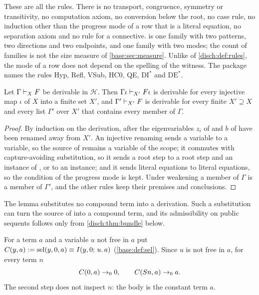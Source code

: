 These are all the rules. There is no transport, congruence, symmetry or
transitivity, no computation axiom, no conversion below the root, no case
rule, no induction other than the progress mode of a row that is a literal
equation, no separation axiom and no rule for a connective. 
is one family with two patterns, two directions and two endpoints, and
 one family with two modes; the count of families is not the
size measure of \cref{base:sec:measure}. Unlike  of
\cref{disch:def:rules}, the mode of a row does not depend on the spelling of
the witness. The package names the rules Hyp, Refl, VSub, HC0, QE,
$\mathrm{DI}^*$ and $\mathrm{DE}^*$.

\begin{lemma}
\label{disch:lem:bundle-struct}
Let $\Gamma\vdash_XF$ be derivable in $\mathcal H$. Then
$\Gamma\iota\vdash_{X'}F\iota$ is derivable for every injective map
$\iota$ of $X$ into a finite set $X'$, and $\Gamma'\vdash_{X'}F$ is
derivable for every finite $X'\supseteq X$ and every list $\Gamma'$ over
$X'$ that contains every member of $\Gamma$.
\end{lemma}

\begin{proof}
By induction on the derivation, after the eigenvariables $z_i$ of
 and $b$ of  have been renamed away from $X'$.
An injective renaming sends a variable to a variable, so the source of
 remains a variable of the scope; it commutes with
capture-avoiding substitution, so it sends a root step to a root step and
an instance of ,  or  to an instance;
and it sends literal equations to literal equations, so the condition of
the progress mode is kept. Under weakening a member of $\Gamma$ is a member
of $\Gamma'$, and the other rules keep their premises and conclusions.
\end{proof}

The lemma substitutes no compound term into a derivation. Such a
substitution can turn the source of  into a compound term,
and its admissibility on public sequents follows only from
\cref{disch:thm:bundle} below.

For a term $a$ and a variable $u$ not free in $a$ put
$C(y,a)\mathrel{:=}\operatorname{sel}(y,0,a)\equiv I(y,0;\,u.\,a)$ (\cref{base:def:sel}). Since
$u$ is not free in $a$, for every term $n$
\begin{equation}
 C(0,a)\to_00,\qquad C(S n,a)\to_0a .
 \label{disch:eq:gate}
\end{equation}
The second step does not inspect $n$: the body is the constant term $a$.

